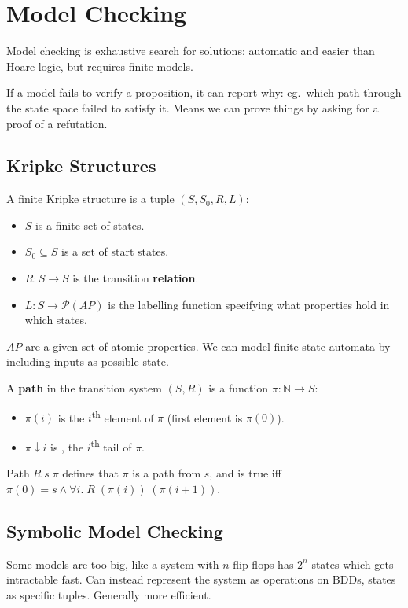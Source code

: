 \documentclass[a4paper, 11pt]{article}
\begin{document}
\section*{Model Checking}
{
    Model checking is exhaustive search for solutions: automatic and easier than Hoare logic, but requires finite models.

    If a model fails to verify a proposition, it can report why: eg.\ which path through the state space failed to satisfy it. Means we can prove things by asking for a proof of a refutation.

    \subsection*{Kripke Structures}
    {
        A finite Kripke structure is a tuple \((S,S_0,R,L)\):
        \begin{itemize}
        \item \(S\) is a finite set of states.
        \item \(S_0 \subseteq S\) is a set of start states.
        \item \(R : S \rightarrow S\) is the transition \textbf{relation}.
        \item \(L : S \rightarrow \mathcal{P}(AP)\) is the labelling function specifying what properties hold in which states.
        \end{itemize}

        \(AP\) are a given set of atomic properties. We can model finite state automata by including inputs as possible state.

        A \textbf{path} in the transition system \((S, R)\) is a function \(\pi : \mathbb{N} \rightarrow S\):
        \begin{itemize}
        \item \(\pi(i)\) is the \(i\)\textsuperscript{th} element of \(\pi\) (first element is \(\pi(0)\)).
        \item \(\pi \downarrow i\) is , the \(i\)\textsuperscript{th} tail of \(\pi\).
        \end{itemize}

        \(\text{Path}\;R\;s\;\pi\) defines that \(\pi\) is a path from \(s\), and is true iff \(\pi(0) = s \wedge \forall i.\;R\;(\pi(i))\;(\pi(i+1))\).
    }
    \subsection*{Symbolic Model Checking}
    {
        Some models are too big, like a system with \(n\) flip-flops has \(2^n\) states which gets intractable fast. Can instead represent the system as operations on BDDs, states as specific tuples. Generally more efficient.
    }
}
\end{document}

